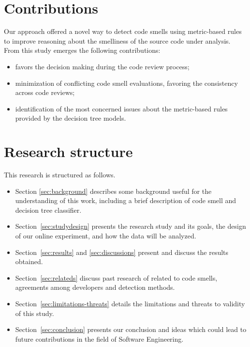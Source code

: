 \section{Contributions}
 
Our approach offered a novel way to detect code smells using metric-based rules to improve reasoning about the smelliness of the source code under analysis.
From this study emerges the following contributions:
     \begin{itemize}
         \item favors the decision making during the code review process;
         \item minimization of conflicting code smell evaluations, favoring the consistency across code reviews;
         \item identification of the most concerned issues about the metric-based rules provided by the decision tree models.
     \end{itemize}

\section{Research structure}

This research is structured as follows. 
\begin{itemize}
    \item Section \ref{sec:background} describes some background useful for the understanding of this work, including a brief description of code smell and decision tree classifier.
    
    \item Section~\ref{sec:studydesign} presents the research study and its goals, the design of our online experiment, and how the data will be analyzed.
    
    \item Section~\ref{sec:results} and \ref{sec:discussions} present and discuss the results obtained.
    
    
    \item Section~\ref{sec:relateds} discuss past research of related to code smells, agreements among developers and detection methods. 
    
    \item Section~\ref{sec:limitations-threats} details the limitations and threats to validity of this study.
    
    \item Section~\ref{sec:conclusion} presents our conclusion and ideas which could lead to future contributions in the field of Software Engineering.
\end{itemize}